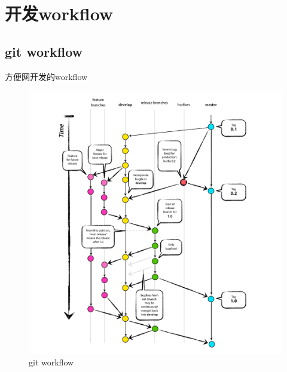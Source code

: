 \section{开发workflow}

\subsection{git workflow}
\par 方便网开发的workflow
\begin{figure}[H]
	\centering
	\includegraphics[width=1.0\textwidth]{graphics/gitflow-model.pdf}
	\caption[Caption for LOF]{git workflow\protect\footnotemark[1]}
	\label{fig:gitflow}
\end{figure}

